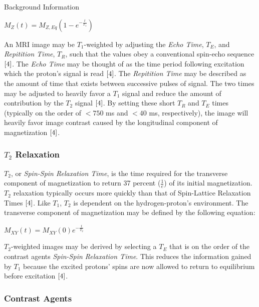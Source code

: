 \documentclass[a4paper,12pt]{article}
\begin{document}
\begin{section}{Background Information}
\begin{center}
$M_Z(t) = M_{Z,Eq}(1 - e^{-\frac{t}{T_1}})$ 
\end{center}

An MRI image may be $T_1$-weighted by adjusting the {\em Echo Time}, $T_E$, and {\em Repitition Time}, $T_R$, such that the values obey a conventional spin-echo sequence $\cite{4}$. The {\em Echo Time} may be thought of as the time period following excitation which the proton's signal is read $\cite{4}$. The {\em Repitition Time} may be described as the amount of time that exists between successive pulses of signal. The two times may be adjusted to heavily favor a $T_1$ signal and reduce the amount of contribution by the $T_2$ signal $\cite{4}$. By setting these short $T_R$ and $T_E$ times (typically on the order of $< 750$ ms and $< 40$ ms, respectively), the image will heavily favor image contrast caused by the longitudinal component of magnetization $\cite{4}$.

\subsubsection{$T_2$ Relaxation}
$T_2$, or {\em Spin-Spin Relaxation Time}, is the time required for the transverse component of magnetization to return 37 percent ($\frac{1}{e}$) of its initial magnetization. $T_2$ relaxation typically occurs more quickly than that of Spin-Lattice Relaxation Times $\cite{4}$. Like $T_1$, $T_2$ is dependent on the hydrogen-proton's environment. The transverse component of magnetization may be defined by the following equation:

\begin{center}
$M_{XY}(t) = M_{XY}(0)e^{-\frac{t}{T_2}}$ 
\end{center}


$T_2$-weighted images may be derived by selecting a $T_E$ that is on the order of the contrast agents {\em Spin-Spin Relaxation Time}. This reduces the information gained by $T_1$ because the excited protons' spins are now allowed to return to equilibrium before excitation $\cite{4}$.

\subsubsection{Contrast Agents}


\end{section}
\end{document}
